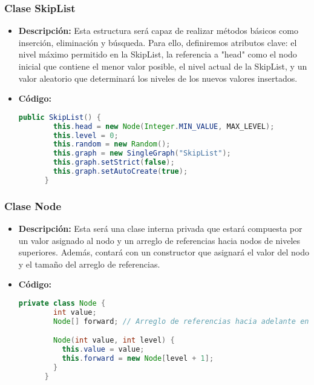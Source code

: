 \documentclass{article}
\begin{document}
  \subsubsection{Clase SkipList}
  \begin{itemize}
    \item \textbf{Descripción: }Esta estructura será capaz de realizar métodos básicos como inserción, eliminación y búsqueda. 
    Para ello, definiremos atributos clave: el nivel máximo permitido en la SkipList, la referencia a "head" como el nodo 
    inicial que contiene el menor valor posible, el nivel actual de la SkipList, y un valor aleatorio que determinará los 
    niveles de los nuevos valores insertados.
    \item \textbf{Código: }
    \begin{lstlisting}[language=Java, caption={Clase SkipList}]
      public SkipList() {
        this.head = new Node(Integer.MIN_VALUE, MAX_LEVEL);
        this.level = 0;
        this.random = new Random();
        this.graph = new SingleGraph("SkipList");
        this.graph.setStrict(false);
        this.graph.setAutoCreate(true);
      }
    \end{lstlisting}
  \end{itemize}
  

  \subsubsection{Clase Node}
  \begin{itemize}
    \item \textbf{Descripción: }Esta será una clase interna privada que estará compuesta por un valor asignado al nodo y un arreglo de 
    referencias hacia nodos de niveles superiores. Además, contará con un constructor que asignará el valor del nodo y el tamaño del 
    arreglo de referencias.
    \item \textbf{Código: }
    \begin{lstlisting}[language=Java, caption={Clase Node}]
      private class Node {
        int value;
        Node[] forward; // Arreglo de referencias hacia adelante en cada nivel

        Node(int value, int level) {
          this.value = value;
          this.forward = new Node[level + 1];
        }
      }
    \end{lstlisting}
  \end{itemize}
  
\end{document}
